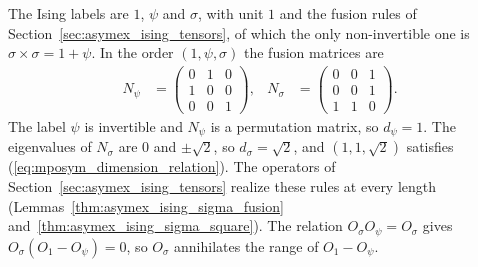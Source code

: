 \begin{example}%
    \label{ex:mposym_ising_dimension}
    \leanok
    The Ising labels are $1$, $\psi$ and $\sigma$, with unit $1$ and the
    fusion rules of Section~\ref{sec:asymex_ising_tensors}, of which the only
    non-invertible one is $\sigma\times\sigma=1+\psi$. In the order
    $(1,\psi,\sigma)$ the fusion matrices are
    \begin{align}
        N_\psi   & =\begin{pmatrix}0&1&0\\1&0&0\\0&0&1\end{pmatrix}, &
        N_\sigma & =\begin{pmatrix}0&0&1\\0&0&1\\1&1&0\end{pmatrix}.
        \label{eq:mposym_ising_matrices}
    \end{align}
    The label $\psi$ is invertible and $N_\psi$ is a permutation matrix, so
    $d_\psi=1$. The eigenvalues of $N_\sigma$ are $0$ and $\pm\sqrt2$, so
    $d_\sigma=\sqrt2$, and $(1,1,\sqrt2)$ satisfies
    (\ref{eq:mposym_dimension_relation}). The operators of
    Section~\ref{sec:asymex_ising_tensors} realize these rules at every length
    (Lemmas~\ref{thm:asymex_ising_sigma_fusion}
    and~\ref{thm:asymex_ising_sigma_square}). The relation
    $O_\sigma O_\psi=O_\sigma$ gives $O_\sigma(O_1-O_\psi)=0$, so $O_\sigma$
    annihilates the range of $O_1-O_\psi$.
\end{example}


